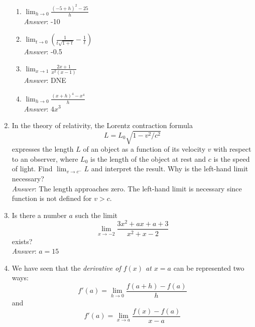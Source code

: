 \documentclass[11pt]{article}
\begin{document}
\begin{enumerate}
\begin{multicols}{2}
\begin{enumerate}
\item$ \lim_{h\rightarrow 0} \frac{(-5+h)^2-25}{h}$\\

{\em Answer}: -10\\

\item $\lim_{t\rightarrow 0 }\left( \frac{1}{t\sqrt{1+t}}-\frac{1}{t} \right)$\\

{\em Answer}: -0.5\\

\item $\lim_{x\rightarrow 1}\frac{2x+1}{x^2(x-1)} $\\

{\em Answer}: DNE\\

\item $\lim_{h\rightarrow 0}\frac{(x+h)^4-x^4}{h}$\\

{\em Answer}: $4x^3$\\

\end{enumerate}

\end{multicols}

\item In the theory of relativity, the Lorentz contraction formula \[L=L_0\sqrt{1-v^2/c^2}\] expresses the length $L$ of an object as a function of its velocity $v$ with respect to an observer, where $L_0$ is the length of the object at rest and $c$ is the speed of light. Find $\lim_{v\rightarrow c^{-}}L$ and interpret the result. Why is the left-hand limit necessary?\\

{\em Answer}: The length approaches zero. The left-hand limit is necessary since function is not defined for $v>c$.\\

\item Is there a number $a$ such the limit \[\lim_{x\rightarrow -2}\frac{3x^2+ax+a+3}{x^2+x-2}\] exists?\\

{\em Answer}: $a=15$\\

\item We have seen that the {\em derivative of $f(x)$ at $x=a$} can be represented two ways: \[f'(a)=\lim_{h\rightarrow 0}\frac{f(a+h)-f(a)}{h}\] and \[f'(a)=\lim_{x\rightarrow a}\frac{f(x)-f(a)}{x-a}\]


\end{enumerate}
\end{document}
